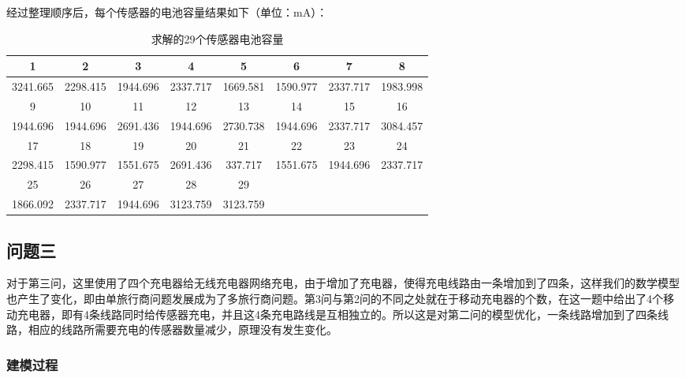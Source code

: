 \documentclass{article}
\begin{document}
经过整理顺序后，每个传感器的电池容量结果如下（单位：mA）：
\vspace{1ex}
\begin{table}[H]
    \begin{tabular}{|c|c|c|c|c|ccc|}
        \hline
        1   &   2   &   3   &   4   &   5   &   \multicolumn{1}{c|}{6}   &   \multicolumn{1}{c|}{7}   &   \multicolumn{1}{c|}{8}\\
        \hline
        3241.665    &   2298.415	&   1944.696	&   2337.717	&   1669.581	&   \multicolumn{1}{c|}{1590.977}	&   \multicolumn{1}{c|}{2337.717}	&   \multicolumn{1}{c|}{1983.998}\\
        \hline
        9	&   10	&   11	&   12	&   13	&   \multicolumn{1}{c|}{14}	&   \multicolumn{1}{c|}{15}	&   \multicolumn{1}{c|}{16}\\
        \hline
        1944.696	&   1944.696	&   2691.436	&   1944.696	&   2730.738	&   \multicolumn{1}{c|}{1944.696}	&   \multicolumn{1}{c|}{2337.717}	&   \multicolumn{1}{c|}{3084.457}\\
        \hline
        17	&   18	&   19	&   20	&   21	 &  \multicolumn{1}{c|}{22}	&   \multicolumn{1}{c|}{23}	&   \multicolumn{1}{c|}{24}\\
        \hline
        2298.415    &   1590.977    &   1551.675    &   2691.436    &   337.717    &   \multicolumn{1}{c|}{1551.675}    &   \multicolumn{1}{c|}{1944.696}    &   \multicolumn{1}{c|}{2337.717}\\
        \hline
        25    &   26    &   27    &   28    &   29\\
        \cline{1-5}
        1866.092    &   2337.717    &  1944.696    &  3123.759    &  3123.759\\
        \cline{1-5}
    \end{tabular}
\caption{求解的29个传感器电池容量}
\end{table}

\subsection{问题三}
对于第三问，这里使用了四个充电器给无线充电器网络充电，由于增加了充电器，使得充电线路由一条增加到了四条，这样我们的数学模型也产生了变化，即由单旅行商问题发展成为了多旅行商问题。第3问与第2问的不同之处就在于移动充电器的个数，在这一题中给出了4个移动充电器，即有4条线路同时给传感器充电，并且这4条充电路线是互相独立的。所以这是对第二问的模型优化，一条线路增加到了四条线路，相应的线路所需要充电的传感器数量减少，原理没有发生变化。

\subsubsection{建模过程}
\end{document}

